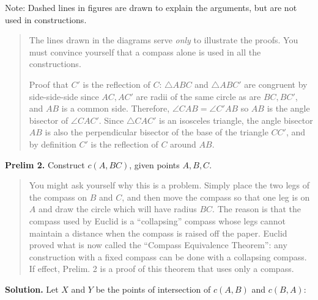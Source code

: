 \documentclass[11pt,a4paper]{article}
\newcommand*{\qed}{%
$\quad\quad$\raisebox{2pt}{\framebox[10pt]{\rule{0pt}{4pt}}}%
}
\begin{document}
Note: Dashed lines in figures are drawn to explain the arguments, but are not used in constructions.  \qed
\begin{quote}
The lines drawn in the diagrams serve \emph{only} to illustrate the proofs. You must convince yourself that a compass alone is used in all the constructions.

Proof that $C'$ is the reflection of $C$: $\triangle ABC$ and $\triangle ABC'$ are congruent by side-side-side since $AC,AC'$ are radii of the same circle as are $BC,BC'$, and $AB$ is a common side. Therefore, $\angle CAB = \angle C'AB$ so $AB$ is the angle bisector of $\angle CAC'$. Since $\triangle CAC'$ is an isosceles triangle, the angle bisector $AB$ is also the perpendicular bisector of the base of the triangle $CC'$, and by definition $C'$ is the reflection of $C$ around $AB$.
\end{quote}


\textbf{Prelim 2.} Construct $c(A,BC)$, given points $A,B,C$.

\begin{quote}
You might ask yourself why this is a problem. Simply place the two legs of the compass on $B$ and $C$, and then move the compass so that one leg is on $A$ and draw the circle which will have radius $BC$. The reason is that the compass used by Euclid is a ``collapsing'' compass whose legs cannot maintain a distance when the compass is raised off the paper. Euclid proved what is now called the ``Compass Equivalence Theorem'': any construction with a fixed compass can be done with a collapsing compass. If effect, Prelim. 2 is a proof of this theorem that uses only a compass.
\end{quote}

\textbf{Solution.} Let $X$ and $Y$ be the points of intersection of $c(A,B)$ and $c(B,A)$:

\begin{center}
\vspace*{-6pt}
\end{center}
\end{document}
